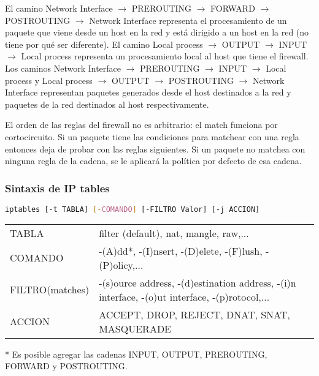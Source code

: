 \documentclass{book}
\begin{document}
	El camino Network Interface $\rightarrow$ PREROUTING $\rightarrow$ FORWARD $\rightarrow$ POSTROUTING $\rightarrow$ Network Interface representa el procesamiento de un paquete que viene desde un host en la red y está dirigido a un host en la red (no tiene por qué ser diferente). El camino Local process $\rightarrow$ OUTPUT $\rightarrow$ INPUT $\rightarrow$ Local process representa un procesamiento local al host que tiene el firewall. Los caminos Network Interface $\rightarrow$ PREROUTING $\rightarrow$ INPUT $\rightarrow$ Local process y Local process $\rightarrow$ OUTPUT $\rightarrow$ POSTROUTING $\rightarrow$ Network Interface representan paquetes generados desde el host destinados a la red y paquetes de la red destinados al host respectivamente.
	
	\vspace{3mm}
	El orden de las reglas del firewall no es arbitrario: el match funciona por cortocircuito. Si un paquete tiene las condiciones para matchear con una regla entonces deja de probar con las reglas siguientes. Si un paquete no matchea con ninguna regla de la cadena, se le aplicará la política por defecto de esa cadena.
	
	\pagebreak
	\subsubsection{Sintaxis de IP tables}
	
	\begin{lstlisting}[language=sh]
	iptables [-t TABLA] [-COMANDO] [-FILTRO Valor] [-j ACCION]
	\end{lstlisting}
	
	\begin{table}[H]
		\centering
		\begin{tabular}{l l}
			TABLA&filter (default), nat, mangle, raw,...\\
			COMANDO&-(A)dd*, -(I)nsert, -(D)elete, -(F)lush, -(P)olicy,...\\
			FILTRO(matches)&-(s)ource address, -(d)estination address, -(i)n interface, -(o)ut interface, -(p)rotocol,...\\
			ACCION&ACCEPT, DROP, REJECT, DNAT, SNAT, MASQUERADE\\
		\end{tabular}
	\end{table}
	
	* Es posible agregar las cadenas INPUT, OUTPUT, PREROUTING, FORWARD y POSTROUTING.
	
	\vspace{3mm}
\end{document}
